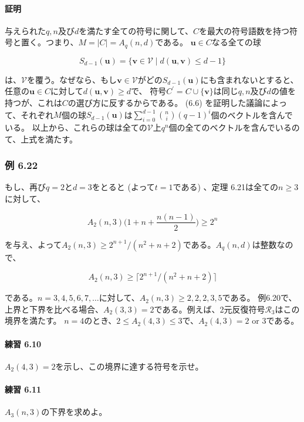 \documentclass[12pt,a4paper]{article}
\begin{document}
      \paragraph{証明}
      与えられた$q, n$及び$d$を満たす全ての符号に関して、$C$を最大の符号語数を持つ符号と置く。つまり、$M = \mid C \mid = A_q (n, d)$である。
      $\mathbf{u} \in C$なる全ての球

      \[ S_{d - 1} (\mathbf{u}) = \lbrace \mathbf{v} \in \mathcal{V} \mid d(\mathbf{u}, \mathbf{v}) \leq d - 1 \rbrace \]

      は、$\mathcal{V}$を覆う。なぜなら、もし$\mathbf{v} \in \mathcal{V}$がどの$S_{d - 1} (\mathbf{u})$にも含まれないとすると、任意の$\mathbf{u} \in C$に対して$d (\mathbf{u}, \mathbf{v}) \geq d$で、
      符号$C^\prime = C \cup \lbrace \mathbf{v} \rbrace$は同じ$q, n$及び$d$の値を持つが、これは$C$の選び方に反するからである。
      (6.6) を証明した議論によって、それぞれ$M$個の球$S_{d-1}(\mathbf{u})$は$\sum_{i=0}^{d-1}\binom ni {(q - 1)}^i$個のベクトルを含んでいる。
      以上から、これらの球は全ての$\mathcal{V}$上$q^n$個の全てのベクトルを含んでいるのて、上式を満たす。

    \subsubsection*{例 6.22}
      もし、再び$q = 2$と$d = 3$をとると (よって$t = 1$である) 、定理 6.21は全ての$n \geq 3$に対して、
      
      \[ A_2 (n, 3) \big( 1 + n + \frac{n(n - 1)}{2} \big) \geq 2^n \]

      を与え、よって$A_2(n,3) \geq 2^{n+1} / (n^2 + n + 2) $である。$A_q (n, d)$は整数なので、

      \[A_2 (n, 3) \geq \lceil 2^{n + 1} / (n^2 + n + 2) \rceil \]

      である。$n = 3, 4, 5, 6, 7, \ldots$に対して、$A_2 (n, 3) \geq 2, 2, 2, 3, 5$である。
      例6.20で、上界と下界を比べる場合、$A_2(3, 3) = 2$である。例えば、2元反復符号$\mathcal{R}_3$はこの境界を満たす。
      $n = 4$のとき、$2 \leq A_2 (4, 3) \leq 3$で、$A_2(4, 3) = 2 \text{ or } 3$である。
      
      \paragraph{練習 6.10}
        $A_2 (4, 3) = 2$を示し、この境界に達する符号を示せ。

      \paragraph{練習 6.11}
        $A_3 (n, 3)$の下界を求めよ。\\
\end{document}
